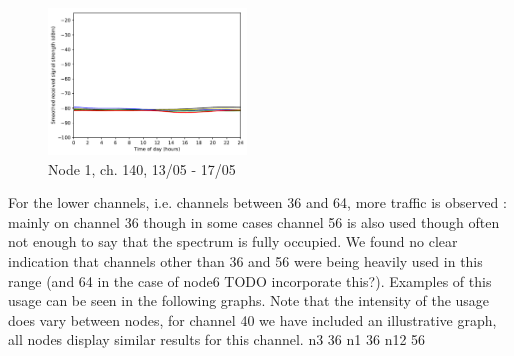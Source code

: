 \documentclass[a4paper, 11pt]{article}
\begin{document}
\begin{figure}[ht]
\centering
\includegraphics[width=0.47\textwidth]{images/5_GHz/node1_2017-05-17_chan140_image.pdf}
\caption{Node 1, ch. 140, 13/05 - 17/05}
\label{node1_5ghz_traffic_chan140}
\end{figure}
For the lower channels, i.e. channels between 36 and 64, more traffic is observed : mainly on channel 36 though in some cases channel 56 is also used though often not enough to say that the spectrum is fully occupied. We found no clear indication that channels other than 36 and 56 were being heavily used in this range (and 64 in the case of node6 TODO incorporate this?). Examples of this usage can be seen in the following graphs. Note that the intensity of the usage does vary between nodes, for channel 40 we have included an illustrative graph, all nodes display similar results for this channel.
n3 36 n1 36 n12 56
\end{document}
